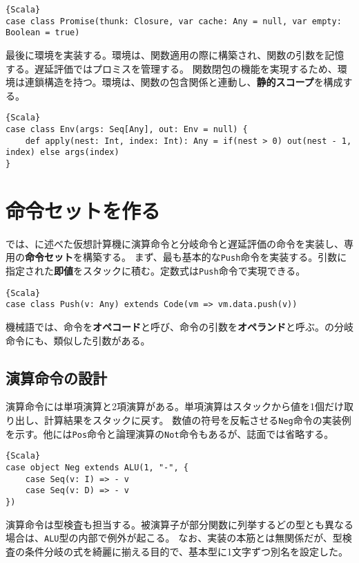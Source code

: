 \documentclass[10pt,a4paper]{book}
\begin{document}
\begin{Verbatim}{Scala}
case class Promise(thunk: Closure, var cache: Any = null, var empty: Boolean = true)
\end{Verbatim}

最後に環境を実装する。環境は、関数適用の際に構築され、関数の引数を記憶する。遅延評価ではプロミスを管理する。
関数閉包の機能を実現するため、環境は連鎖構造を持つ。環境は、関数の包含関係と連動し、\textbf{静的スコープ}を構成する。

\begin{Verbatim}{Scala}
case class Env(args: Seq[Any], out: Env = null) {
	def apply(nest: Int, index: Int): Any = if(nest > 0) out(nest - 1, index) else args(index)
}
\end{Verbatim}

\chapter{命令セットを作る\label{chap:ISA}}

では、に述べた仮想計算機に演算命令と分岐命令と遅延評価の命令を実装し、専用の\textbf{命令セット}を構築する。
まず、最も基本的な\texttt{Push}命令を実装する。引数に指定された\textbf{即値}をスタックに積む。定数式は\texttt{Push}命令で実現できる。

\begin{Verbatim}{Scala}
case class Push(v: Any) extends Code(vm => vm.data.push(v))
\end{Verbatim}

機械語では、命令を\textbf{オペコード}と呼び、命令の引数を\textbf{オペランド}と呼ぶ。の分岐命令にも、類似した引数がある。

\section{演算命令の設計}

演算命令には単項演算と2項演算がある。単項演算はスタックから値を1個だけ取り出し、計算結果をスタックに戻す。
数値の符号を反転させる\texttt{Neg}命令の実装例を示す。他には\texttt{Pos}命令と論理演算の\texttt{Not}命令もあるが、誌面では省略する。

\begin{Verbatim}{Scala}
case object Neg extends ALU(1, "-", {
	case Seq(v: I) => - v
	case Seq(v: D) => - v
})
\end{Verbatim}

演算命令は型検査も担当する。被演算子が部分関数に列挙するどの型とも異なる場合は、\texttt{ALU}型の内部で例外が起こる。
なお、実装の本筋とは無関係だが、型検査の条件分岐の式を綺麗に揃える目的で、基本型に1文字ずつ別名を設定した。
\end{document}
